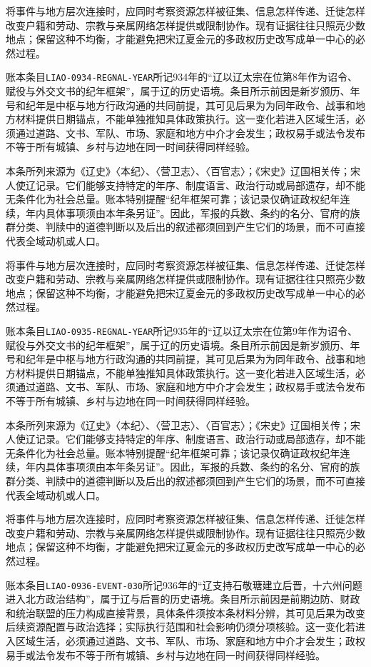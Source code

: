 将事件与地方层次连接时，应同时考察资源怎样被征集、信息怎样传递、迁徙怎样改变户籍和劳动、宗教与亲属网络怎样提供或限制协作。现有证据往往只照亮少数地点；保留这种不均衡，才能避免把宋辽夏金元的多政权历史改写成单一中心的必然过程。

账本条目\texttt{LIAO-0934-REGNAL-YEAR}所记934年的“辽以辽太宗在位第8年作为诏令、赋役与外交文书的纪年框架”，属于辽的历史语境。条目所示前因是新岁颁历、年号和纪年是中枢与地方行政沟通的共同前提，其可见后果为为同年政令、战事和地方材料提供日期锚点，不能单独推知具体政策执行。这一变化若进入区域生活，必须通过道路、文书、军队、市场、家庭和地方中介才会发生；政权易手或法令发布不等于所有城镇、乡村与边地在同一时间获得同样经验。

本条所列来源为《辽史》〈本纪〉、〈营卫志〉、〈百官志〉；《宋史》辽国相关传；宋人使辽记录。它们能够支持特定的年序、制度语言、政治行动或局部遗存，却不能无条件化为社会总量。账本特别提醒“纪年框架可靠；该记录仅确证政权纪年连续，年内具体事项须由本年条另证”。因此，军报的兵数、条约的名分、官府的族群分类、判牍中的道德判断以及后出的叙述都须回到产生它们的场景，而不可直接代表全域动机或人口。

将事件与地方层次连接时，应同时考察资源怎样被征集、信息怎样传递、迁徙怎样改变户籍和劳动、宗教与亲属网络怎样提供或限制协作。现有证据往往只照亮少数地点；保留这种不均衡，才能避免把宋辽夏金元的多政权历史改写成单一中心的必然过程。

账本条目\texttt{LIAO-0935-REGNAL-YEAR}所记935年的“辽以辽太宗在位第9年作为诏令、赋役与外交文书的纪年框架”，属于辽的历史语境。条目所示前因是新岁颁历、年号和纪年是中枢与地方行政沟通的共同前提，其可见后果为为同年政令、战事和地方材料提供日期锚点，不能单独推知具体政策执行。这一变化若进入区域生活，必须通过道路、文书、军队、市场、家庭和地方中介才会发生；政权易手或法令发布不等于所有城镇、乡村与边地在同一时间获得同样经验。

本条所列来源为《辽史》〈本纪〉、〈营卫志〉、〈百官志〉；《宋史》辽国相关传；宋人使辽记录。它们能够支持特定的年序、制度语言、政治行动或局部遗存，却不能无条件化为社会总量。账本特别提醒“纪年框架可靠；该记录仅确证政权纪年连续，年内具体事项须由本年条另证”。因此，军报的兵数、条约的名分、官府的族群分类、判牍中的道德判断以及后出的叙述都须回到产生它们的场景，而不可直接代表全域动机或人口。

将事件与地方层次连接时，应同时考察资源怎样被征集、信息怎样传递、迁徙怎样改变户籍和劳动、宗教与亲属网络怎样提供或限制协作。现有证据往往只照亮少数地点；保留这种不均衡，才能避免把宋辽夏金元的多政权历史改写成单一中心的必然过程。

账本条目\texttt{LIAO-0936-EVENT-030}所记936年的“辽支持石敬瑭建立后晋，十六州问题进入北方政治结构”，属于辽与后晋的历史语境。条目所示前因是前期边防、财政和统治联盟的压力构成直接背景，具体条件须按本条材料分辨，其可见后果为改变后续资源配置与政治选择；实际执行范围和社会影响仍须分项核验。这一变化若进入区域生活，必须通过道路、文书、军队、市场、家庭和地方中介才会发生；政权易手或法令发布不等于所有城镇、乡村与边地在同一时间获得同样经验。

